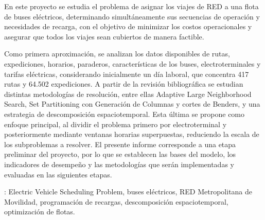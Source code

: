 En este proyecto se estudia el problema de asignar los viajes de RED a una flota de buses el\'ectricos, determinando simult\'aneamente sus secuencias de operaci\'on y necesidades de recarga, con el objetivo de minimizar los costos operacionales y asegurar que todos los viajes sean cubiertos de manera factible.

Como primera aproximaci\'on, se analizan los datos disponibles de rutas, expediciones, horarios, paraderos, caracter\'isticas de los buses, electroterminales y tarifas el\'ectricas, considerando inicialmente un d\'ia laboral, que concentra 417 rutas y 64.502 expediciones. A partir de la revisi\'on bibliogr\'afica se estudian distintas metodolog\'ias de resoluci\'on, entre ellas Adaptive Large Neighborhood Search, Set Partitioning con Generaci\'on de Columnas y cortes de Benders, y una estrategia de descomposici\'on espaciotemporal. Esta \'ultima se propone como enfoque principal, al dividir el problema primero por electroterminal y posteriormente mediante ventanas horarias superpuestas, reduciendo la escala de los subproblemas a resolver. El presente informe corresponde a una etapa preliminar del proyecto, por lo que se establecen las bases del modelo, los indicadores de desempe\~no y las metodolog\'ias que ser\'an implementadas y evaluadas en las siguientes etapas.

\vfill
{}: Electric Vehicle Scheduling Problem, buses el\'ectricos, RED Metropolitana de Movilidad, programaci\'on de recargas, descomposici\'on espaciotemporal, optimizaci\'on de flotas.
